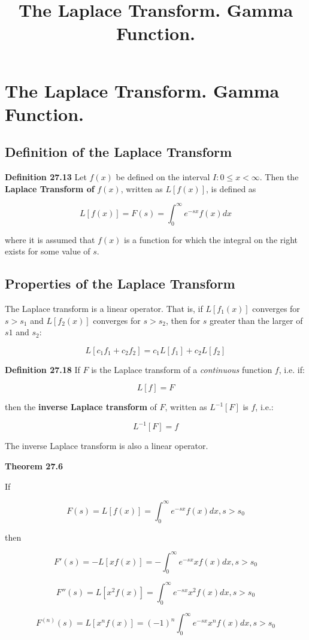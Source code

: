 \documentclass{article}
\title{The Laplace Transform. Gamma Function.}
\begin{document}
\section{The Laplace Transform. Gamma Function.}

\subsection{Definition of the Laplace Transform}

\textbf{Definition 27.13} Let $f(x)$ be defined on the interval $I: 0 \leq x \lt \infty$. Then the \textbf{Laplace Transform of} $f(x)$, written as $L[f(x)]$, is defined as

\[ \tag{27.14} L[f(x)] = F(s) = \int_0^{\infty} e^{-sx}f(x)dx \]

where it is assumed that $f(x)$ is a function for which the integral on the right exists for some value of $s$.

\subsection{Properties of the Laplace Transform}

The Laplace transform is a linear operator. That is, if $L[f_1 (x)]$ converges for $s > s_1$ and $L[f_2 (x)]$ converges for $s > s_2$, then for $s$ greater than the larger of $s1$ and $s_2$:

\[ \tag{27.17} L[c_1 f_1 + c_2 f_2] = c_1 L[f_1] + c_2 L[f_2] \]

\textbf{Definition 27.18} If $F$ is the Laplace transform of a \emph{\@{continuous}} function $f$, i.e. if:

\[ L[f] = F \]

then the \textbf{inverse Laplace transform} of $F$, written as $L^{-1}[F]$ is $f$, i.e.:

\[ L^{-1}[F] = f \]

The inverse Laplace transform is also a linear operator.

\textbf{Theorem 27.6}

If

\[ \tag{27.61} F(s) = L[f(x)] = \int_0^{\infty} e^{-sx}f(x)dx, s > s_0 \]

then

\[ \tag{27.62} F'(s) = -L[xf(x)] = - \int_0^{\infty} e^{-sx}xf(x)dx, s > s_0 \]

\[ F''(s) = L[x^2 f(x)] = \int_0^{\infty} e^{-sx}x^2 f(x)dx, s > s_0 \]

\[ F^{(n)}(s) = L[x^n f(x)] = (-1)^n \int_0^{\infty} e^{-sx}x^n f(x)dx, s > s_0 \]
\end{document}
